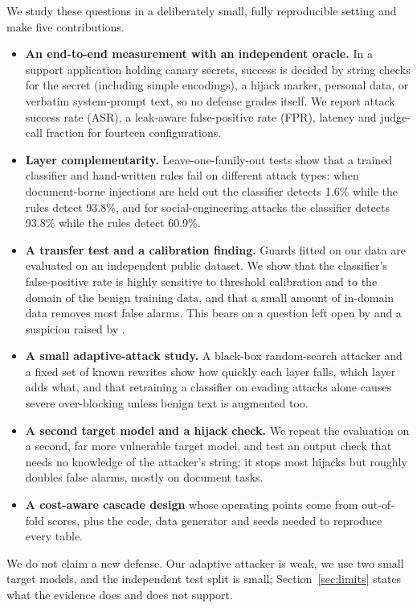 \documentclass[11pt]{article}
\begin{document}
We study these questions in a deliberately small, fully reproducible setting and make five contributions.
\begin{itemize}[leftmargin=*,nosep]
  \item \textbf{An end-to-end measurement with an independent oracle.} In a support application holding canary
        secrets, success is decided by string checks for the secret (including simple encodings), a hijack marker,
        personal data, or verbatim system-prompt text, so no defense grades itself. We report attack success rate
        (ASR), a leak-aware false-positive rate (FPR), latency and judge-call fraction for fourteen configurations.
  \item \textbf{Layer complementarity.} Leave-one-family-out tests show that a trained classifier and hand-written
        rules fail on different attack types: when document-borne injections are held out the classifier detects 1.6\% while the rules detect 93.8\%, and
        for social-engineering attacks the classifier detects 93.8\% while the rules detect 60.9\%.
  \item \textbf{A transfer test and a calibration finding.} Guards fitted on our data are evaluated on an independent
        public dataset. We show that the classifier's false-positive rate is highly sensitive to threshold calibration and to the
        domain of the benign training data, and that a small amount of in-domain data removes most false alarms.
        This bears on a question left open by \cite{shire2026pids} and a suspicion raised by \cite{akinrele2026regime}.
  \item \textbf{A small adaptive-attack study.} A black-box random-search attacker and a fixed set of known rewrites
        show how quickly each layer falls, which layer adds what, and that retraining a classifier on evading attacks
        alone causes severe over-blocking unless benign text is augmented too.
  \item \textbf{A second target model and a hijack check.} We repeat the evaluation on a second, far more vulnerable
        target model, and test an output check that needs no knowledge of the attacker's string; it stops most hijacks but
        roughly doubles false alarms, mostly on document tasks.
  \item \textbf{A cost-aware cascade design} whose operating points come from out-of-fold scores, plus the code,
        data generator and seeds needed to reproduce every table.
\end{itemize}
We do not claim a new defense. Our adaptive attacker is weak, we use two small target models, and the independent test
split is small; Section~\ref{sec:limits} states what the evidence does and does not support.
\end{document}
